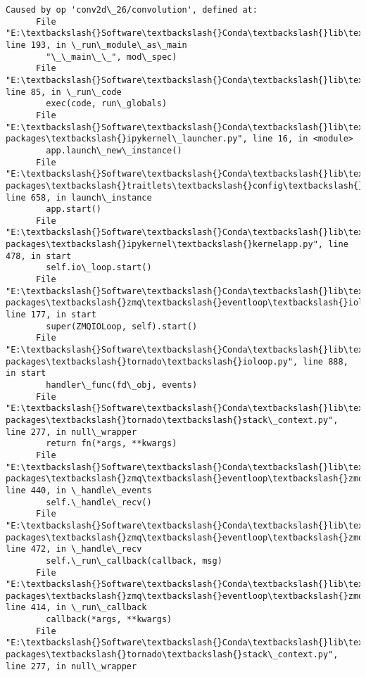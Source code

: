 \documentclass[11pt]{article}
\begin{document}
\begin{Verbatim}[commandchars=\\\{\}]
    Caused by op 'conv2d\_26/convolution', defined at:
      File "E:\textbackslash{}Software\textbackslash{}Conda\textbackslash{}lib\textbackslash{}runpy.py", line 193, in \_run\_module\_as\_main
        "\_\_main\_\_", mod\_spec)
      File "E:\textbackslash{}Software\textbackslash{}Conda\textbackslash{}lib\textbackslash{}runpy.py", line 85, in \_run\_code
        exec(code, run\_globals)
      File "E:\textbackslash{}Software\textbackslash{}Conda\textbackslash{}lib\textbackslash{}site-packages\textbackslash{}ipykernel\_launcher.py", line 16, in <module>
        app.launch\_new\_instance()
      File "E:\textbackslash{}Software\textbackslash{}Conda\textbackslash{}lib\textbackslash{}site-packages\textbackslash{}traitlets\textbackslash{}config\textbackslash{}application.py", line 658, in launch\_instance
        app.start()
      File "E:\textbackslash{}Software\textbackslash{}Conda\textbackslash{}lib\textbackslash{}site-packages\textbackslash{}ipykernel\textbackslash{}kernelapp.py", line 478, in start
        self.io\_loop.start()
      File "E:\textbackslash{}Software\textbackslash{}Conda\textbackslash{}lib\textbackslash{}site-packages\textbackslash{}zmq\textbackslash{}eventloop\textbackslash{}ioloop.py", line 177, in start
        super(ZMQIOLoop, self).start()
      File "E:\textbackslash{}Software\textbackslash{}Conda\textbackslash{}lib\textbackslash{}site-packages\textbackslash{}tornado\textbackslash{}ioloop.py", line 888, in start
        handler\_func(fd\_obj, events)
      File "E:\textbackslash{}Software\textbackslash{}Conda\textbackslash{}lib\textbackslash{}site-packages\textbackslash{}tornado\textbackslash{}stack\_context.py", line 277, in null\_wrapper
        return fn(*args, **kwargs)
      File "E:\textbackslash{}Software\textbackslash{}Conda\textbackslash{}lib\textbackslash{}site-packages\textbackslash{}zmq\textbackslash{}eventloop\textbackslash{}zmqstream.py", line 440, in \_handle\_events
        self.\_handle\_recv()
      File "E:\textbackslash{}Software\textbackslash{}Conda\textbackslash{}lib\textbackslash{}site-packages\textbackslash{}zmq\textbackslash{}eventloop\textbackslash{}zmqstream.py", line 472, in \_handle\_recv
        self.\_run\_callback(callback, msg)
      File "E:\textbackslash{}Software\textbackslash{}Conda\textbackslash{}lib\textbackslash{}site-packages\textbackslash{}zmq\textbackslash{}eventloop\textbackslash{}zmqstream.py", line 414, in \_run\_callback
        callback(*args, **kwargs)
      File "E:\textbackslash{}Software\textbackslash{}Conda\textbackslash{}lib\textbackslash{}site-packages\textbackslash{}tornado\textbackslash{}stack\_context.py", line 277, in null\_wrapper

\end{Verbatim}
\end{document}
